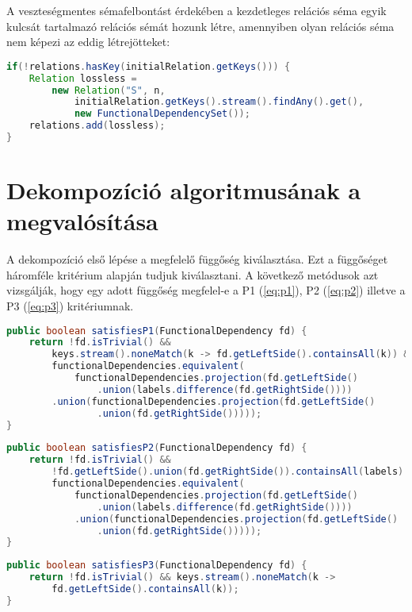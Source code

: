 A veszteségmentes sémafelbontást érdekében a kezdetleges relációs séma egyik kulcsát tartalmazó relációs sémát hozunk létre, amennyiben olyan relációs séma nem képezi az eddig létrejötteket:

\linespread{1}
\begin{lstlisting}[language=Java]
if(!relations.hasKey(initialRelation.getKeys())) {
	Relation lossless = 
		new Relation("S", n, 
			initialRelation.getKeys().stream().findAny().get(),
			new FunctionalDependencySet());
	relations.add(lossless);
}
\end{lstlisting}

\section{Dekompozíció algoritmusának a megvalósítása}

A dekompozíció első lépése a megfelelő függőség kiválasztása. Ezt a függőséget háromféle kritérium alapján tudjuk kiválasztani. A következő metódusok azt vizsgálják, hogy egy adott függőség megfelel-e a P1 (\ref{eq:p1}), P2 (\ref{eq:p2}) illetve a P3 (\ref{eq:p3}) kritériumnak. 

\linespread{1}
\begin{lstlisting}[language=Java]
public boolean satisfiesP1(FunctionalDependency fd) {
	return !fd.isTrivial() &&
		keys.stream().noneMatch(k -> fd.getLeftSide().containsAll(k)) && 
		functionalDependencies.equivalent(
			functionalDependencies.projection(fd.getLeftSide()
				.union(labels.difference(fd.getRightSide())))
		.union(functionalDependencies.projection(fd.getLeftSide()
				.union(fd.getRightSide()))));
}
\end{lstlisting}

\linespread{1}
\begin{lstlisting}[language=Java]
public boolean satisfiesP2(FunctionalDependency fd) {
	return !fd.isTrivial() &&
		!fd.getLeftSide().union(fd.getRightSide()).containsAll(labels) &&
		functionalDependencies.equivalent(
			functionalDependencies.projection(fd.getLeftSide()
				.union(labels.difference(fd.getRightSide())))
			.union(functionalDependencies.projection(fd.getLeftSide()
				.union(fd.getRightSide()))));
}
\end{lstlisting}

\linespread{1}
\begin{lstlisting}[language=Java]
public boolean satisfiesP3(FunctionalDependency fd) {
	return !fd.isTrivial() && keys.stream().noneMatch(k ->
		fd.getLeftSide().containsAll(k));
}
\end{lstlisting}


